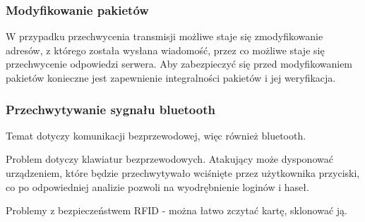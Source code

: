 \subsubsection{Modyfikowanie pakietów}

W przypadku przechwycenia transmisji możliwe staje się zmodyfikowanie adresów, z którego została wysłana wiadomość, przez co możliwe staje się przechwycenie odpowiedzi serwera. Aby zabezpieczyć się przed modyfikowaniem pakietów konieczne jest zapewnienie integralności pakietów i jej weryfikacja.

\subsubsection{Przechwytywanie sygnału bluetooth}

Temat dotyczy komunikacji bezprzewodowej, więc również bluetooth.

Problem dotyczy klawiatur bezprzewodowych. Atakujący może dysponować urządzeniem, które będzie przechwytywało wciśnięte przez użytkownika przyciski, co po odpowiedniej analizie pozwoli na wyodrębnienie loginów i haseł.

Problemy z bezpieczeństwem RFID - można łatwo zczytać kartę, sklonować ją.
